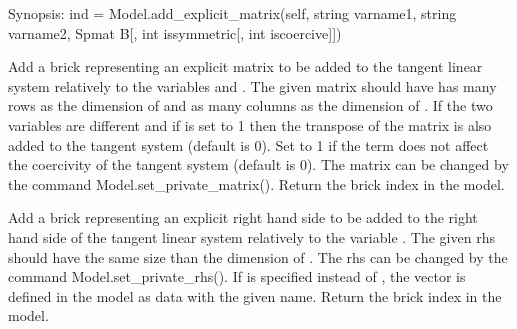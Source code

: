 \documentclass[a4paper,11pt,english]{sphinxmanual}
\begin{document}
\begin{fulllineitems}
\begin{fulllineitems}
\end{fulllineitems}


\begin{fulllineitems}
\label{\detokenize{python/cmdref_Model:getfem.Model.add_explicit_matrix}}
Synopsis: ind = Model.add\_explicit\_matrix(self, string varname1, string varname2, Spmat B{[}, int issymmetric{[}, int iscoercive{]}{]})

Add a brick representing an explicit matrix to be added to the tangent
linear system relatively to the variables  and .
The given matrix should have has many rows as the dimension of
 and as many columns as the dimension of .
If the two variables are different and if  is set to 1
then the transpose of the matrix is also added to the tangent system
(default is 0). Set  to 1 if the term does not affect the
coercivity of the tangent system (default is 0). The matrix can be
changed by the command Model.set\_private\_matrix(). Return the
brick index in the model.

\end{fulllineitems}


\begin{fulllineitems}
\label{\detokenize{python/cmdref_Model:getfem.Model.add_explicit_rhs}}
Add a brick representing an explicit right hand side to be added to
the right hand side of the tangent linear system relatively to the
variable . The given rhs should have the same size than the
dimension of . The rhs can be changed by the command
Model.set\_private\_rhs(). If  is specified instead of
, the vector  is defined in the model as data with the given name.
Return the brick index in the model.


\end{fulllineitems}
\end{fulllineitems}
\end{document}
